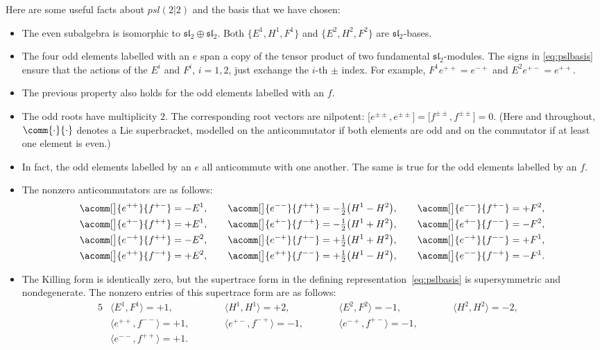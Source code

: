 \documentclass[10pt,a4paper]{amsart}
\numberwithin{equation}{section}
\newcommand{\alg}[1]{\mathfrak{#1}} %
\newcommand{\SLA}[2]{\alg{#1}_{#2}} %
\newcommand{\SLSA}[3]{\alg{#1}_{#2 \vert #3}} %
\newcommand{\sltwo}{\SLA{sl}{2}}
\newcommand{\psl}{\SLSA{psl}{2}{2}}
\def\smash#1{#1}
\def\psl{psl(2|2)}
\begin{document}
Here are some useful facts about \smash{$\psl$} and the basis that we have chosen:
\begin{itemize}\itemsep=0pt
	\item The even subalgebra is isomorphic to $\sltwo \oplus \sltwo$.
	Both $\big\{ E^1,H^1,F^1\big\}$ and $\big\{ E^2,H^2,F^2\big\}$ are $\sltwo$-bases.
	\item The four odd elements labelled with an $e$ span a copy of the tensor product of two fundamental $\sltwo$-modules.
	The signs in \eqref{eq:pslbasis} ensure that the actions of the $E^i$ and $F^i$, $i=1,2$, just exchange the $i$-th $\pm$ index.
	For example,
$
		F^1 e^{++} = e^{-+}$ and $ E^2 e^{+-} = e^{++}$.
	\item The previous property also holds for the odd elements labelled with an $f$.
	\item The odd roots have multiplicity $2$.
	The corresponding root vectors are nilpotent: $\big\lbrack e^{\pm\pm},e^{\pm\pm}\big\rbrack = \big\lbrack f^{\pm\pm},f^{\pm\pm}\big\rbrack = 0$.
	(Here and throughout, $\comm{\cdot}{\cdot}$ denotes a Lie superbracket, modelled on the anticommutator if both elements are odd and on the commutator if at least one element is even.)
	\item In fact, the odd elements labelled by an $e$ all anticommute with one another.
	The same is true for the odd elements labelled by an $f$.
	\item The nonzero anticommutators are as follows:
		\begin{gather*}%
	\acomm[\big]{e^{++}}{f^{+-}} = -E^1, \qquad \acomm[\big]{e^{--}}{f^{++}} = -\tfrac{1}{2}\big(H^1-H^2\big), \qquad \acomm[\big]{e^{--}}{f^{+-}} = +F^2, \\
			\acomm[\big]{e^{+-}}{f^{++}} = +E^1, \qquad \acomm[\big]{e^{+-}}{f^{-+}} = -\tfrac{1}{2}\big(H^1+H^2\big), \qquad \acomm[\big]{e^{+-}}{f^{--}} = -F^2, \\
			\acomm[\big]{e^{-+}}{f^{++}} = -E^2, \qquad \acomm[\big]{e^{-+}}{f^{+-}} = +\tfrac{1}{2}\big(H^1+H^2\big), \qquad \acomm[\big]{e^{-+}}{f^{--}} = +F^1, \\
			\acomm[\big]{e^{++}}{f^{-+}} = +E^2, \qquad\acomm[\big]{e^{++}}{f^{--}} = +\tfrac{1}{2}\big(H^1-H^2\big), \qquad \acomm[\big]{e^{--}}{f^{-+}} = -F^1.
	\end{gather*}
	\item The Killing form is identically zero, but the supertrace form in the defining representation~\eqref{eq:pslbasis} is supersymmetric and nondegenerate.
	The nonzero entries of this supertrace form are as follows:
	\begin{alignat}{5}
			&\big\langle E^1,F^1\big\rangle = +1, \qquad&& \big\langle H^1,H^1\big\rangle = +2, \qquad&& \big\langle E^2,F^2\big\rangle = -1, \qquad&& \big\langle H^2,H^2\big\rangle = -2,&\nonumber \\
			&\big\langle e^{++},f^{--}\big\rangle = +1, \qquad&&\big\langle e^{+-},f^{-+}\big\rangle = -1, \qquad&& \big\langle e^{-+},f^{+-}\big\rangle = -1, \qquad && & \nonumber\\
& \big\langle e^{--},f^{++}\big\rangle = +1. &&&&&& &\label{eq:supertrace}
		\end{alignat}
\end{itemize}
\end{document}
